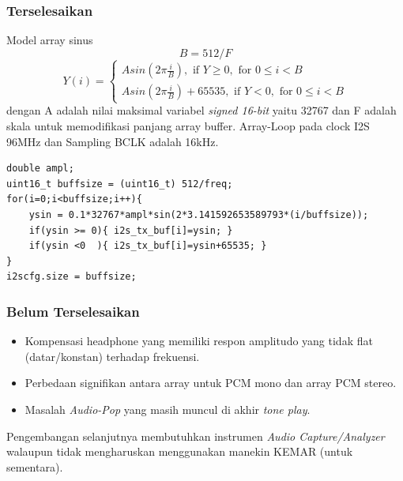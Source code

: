\documentclass[table,dvipsnames,10pt]{beamer}
\begin{document}
	\begin{frame}[fragile]
	\frametitle{Terselesaikan}
	\begin{exampleblock}{Model array sinus}
		\[ B = 512/F \]
		\[
		Y(i) =
		\begin{cases}
		A sin(2 \pi \frac{i}{B}), \text{ if } Y \geq 0, \text{ for } 0 \leq i < B\\
		A sin(2 \pi \frac{i}{B})+65535, \text{ if } Y < 0, \text{ for } 0 \leq i < B
		\end{cases}
		\]
		dengan A adalah nilai maksimal variabel \textit{signed 16-bit} yaitu 32767
		dan F adalah skala untuk memodifikasi panjang array buffer.
		Array-Loop pada clock I2S 96MHz dan Sampling BCLK adalah 16kHz.
	\end{exampleblock}
	\begin{exampleblock}{}
		\begin{verbatim}
double ampl;
uint16_t buffsize = (uint16_t) 512/freq;
for(i=0;i<buffsize;i++){
	ysin = 0.1*32767*ampl*sin(2*3.141592653589793*(i/buffsize));
	if(ysin >= 0){ i2s_tx_buf[i]=ysin; }
	if(ysin <0  ){ i2s_tx_buf[i]=ysin+65535; }
}
i2scfg.size = buffsize;
		\end{verbatim}
	\end{exampleblock}
	\end{frame}

	\begin{frame}[fragile]
	\frametitle{Belum Terselesaikan}
	\begin{exampleblock}{}
		\begin{itemize}
			\item Kompensasi headphone yang memiliki respon amplitudo yang
			tidak flat (datar/konstan) terhadap frekuensi.
			
			\item Perbedaan signifikan antara array untuk PCM mono dan array PCM stereo.
			
			\item Masalah \textit{Audio-Pop} yang masih muncul di akhir \textit{tone play}.
		\end{itemize}
	\end{exampleblock}
	\begin{exampleblock}{}
		Pengembangan selanjutnya membutuhkan instrumen \textit{Audio Capture/Analyzer}
		walaupun tidak mengharuskan menggunakan manekin KEMAR (untuk sementara).
	\end{exampleblock}
	\end{frame}
	
\end{document}
